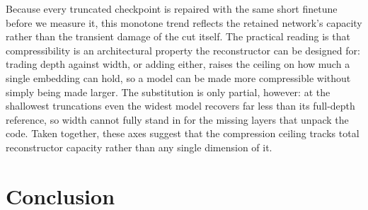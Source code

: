 \documentclass{article}
\theoremstyle{plain}
\theoremstyle{definition}
\theoremstyle{remark}
\begin{document}
Because every truncated checkpoint is repaired with the same short finetune before we measure it, this monotone trend reflects the retained network's capacity rather than the transient damage of the cut itself. The practical reading is that compressibility is an architectural property the reconstructor can be designed for: trading depth against width, or adding either, raises the ceiling on how much a single embedding can hold, so a model can be made more compressible without simply being made larger. The substitution is only partial, however: at the shallowest truncations even the widest model recovers far less than its full-depth reference, so width cannot fully stand in for the missing layers that unpack the code. Taken together, these axes suggest that the compression ceiling tracks total reconstructor capacity rather than any single dimension of it.


\begin{table}[t]
    \centering
    \caption{Compression capacity (mean perfectly crammed tokens over $50$ PG19 samples) vs.\ model and retained depth. Columns give the number of first decoder layers kept (then finetuned); ``Full'' is the untruncated model; each model name carries its total decoder-layer count. ``--'' marks configurations we did not run. Compression rises with both retained depth (left to right) and model size (top to bottom).}
    \label{tab:depth_size_pivot}
    \begin{small}
    
    \end{small}
\end{table}


\section{Conclusion}
\end{document}

